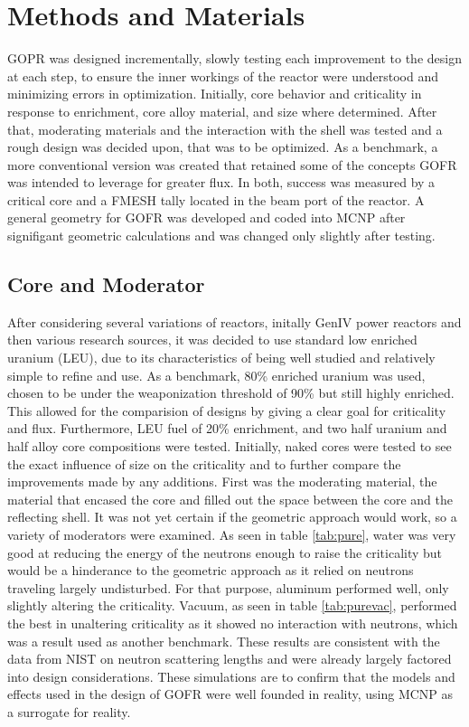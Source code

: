 \label{sec:methods}
\section{Methods and Materials}

GOPR was designed incrementally, slowly testing each improvement to the design at each step, to ensure the inner workings of the reactor were understood and minimizing errors in optimization.  Initially, core behavior and criticality in response to enrichment, core alloy material, and size where determined. After that, moderating materials and the interaction with the shell was tested and a rough design was decided upon, that was to be optimized. As a benchmark, a more conventional version was created that retained some of the concepts GOFR was intended to leverage for greater flux. In both, success was measured by a critical core and a FMESH tally located in the beam port of the reactor. A general geometry for GOFR was developed and coded into MCNP after signifigant geometric calculations and was changed only slightly after testing.

\subsection{Core and Moderator}

After considering several variations of reactors, initally GenIV power reactors and then various research sources, it was decided to use standard low enriched uranium (LEU), due to its characteristics of being well studied and relatively simple to refine and use. As a benchmark, 80\% enriched uranium was used, chosen to be under the weaponization threshold of 90\% but still highly enriched. This allowed for the comparision of designs by giving a clear goal for criticality and flux. Furthermore, LEU fuel of 20\% enrichment, and two half uranium and half alloy core compositions were tested. Initially, naked cores were tested to see the exact influence of size on the criticality and to further compare the improvements made by any additions. First was the moderating material, the material that encased the core and filled out the space between the core and the reflecting shell. It was not yet certain if the geometric approach would work, so a variety of moderators were examined. As seen in table \ref{tab:pure}, water was very good at reducing the energy of the neutrons enough to raise the criticality but would be a hinderance to the geometric approach as it relied on neutrons traveling largely undisturbed. For that purpose, aluminum performed well, only slightly altering the criticality. Vacuum, as seen in table \ref{tab:purevac}, performed the best in unaltering criticality as it showed no interaction with neutrons, which was a result used as another benchmark. These results are consistent with the data from NIST on neutron scattering lengths and were already largely factored into design considerations. These simulations are to confirm that the models and effects used in the design of GOFR were well founded in reality, using MCNP as a surrogate for reality.

